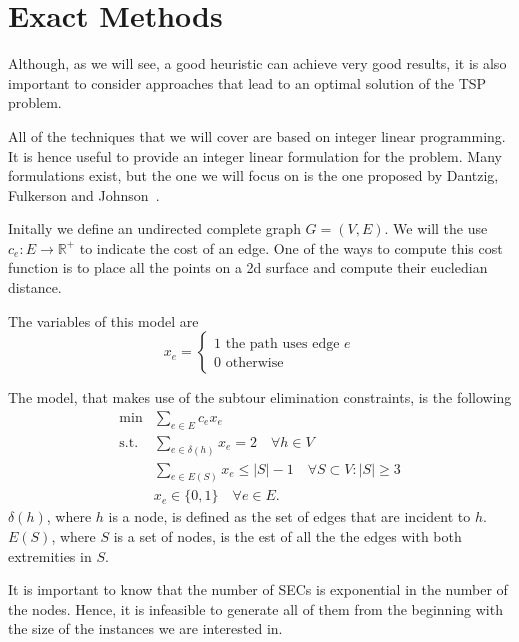 \documentclass{article}
\begin{document}
\clearpage

\section{Exact Methods}
Although, as we will see, a good heuristic can achieve very good results, it is also
important to consider approaches that lead to an optimal solution of the
TSP problem.

All of the techniques that we will cover are based on integer linear programming. It is
hence useful to provide an integer linear formulation for the problem.
Many formulations exist, but the one we will focus on is the one proposed by
Dantzig, Fulkerson and Johnson~\cite{dantzig1954solution}.

Initally we define an undirected complete graph $G=(V, E)$.
We will the use $c_e : E \rightarrow \mathbb{R}^+$ to indicate the cost of
an edge.
One of the ways to compute this cost function is to place all the points
on a 2d surface and compute their eucledian distance.

The variables of this model are
\begin{equation*}
        x_e =
        \left\{
                \begin{array}{l}
                1 \text{ the path uses edge $e$}\\
                0 \text{ otherwise }
        \end{array}
        \right.
\end{equation*}

The model, that makes use of the subtour elimination constraints, is the
following
\begin{equation}
  \begin{aligned}
\min & \sum_{e \in E} c_e x_e \\
\text{s.t.}
& \sum_{e \in \delta(h)} x_{e} = 2 \quad \forall h \in V \\
& \sum_{e \in E(S)} x_{e} \leq |S| - 1 \quad \forall S \subset V : |S| \geq 3 \\
& x_{e} \in \{0, 1\} \quad \forall e \in E.
\end{aligned}
\end{equation}
$\delta(h)$, where $h$ is a node, is defined as the set of edges that are
incident to $h$. $E(S)$, where $S$ is a set of nodes, is the est of all the
the edges with both extremities in $S$.

It is important to know that the number of SECs is exponential in the number of
the nodes. Hence, it is infeasible to generate all of them from the beginning
with the size of the instances we are interested in.
\end{document}
